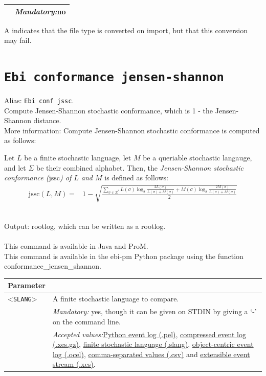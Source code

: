{\begin{tabularx}{\linewidth}{lX}
&\textit{Mandatory:}\quad no\\
\bottomrule
\end{tabularx}
A \textdagger{} indicates that the file type is converted on import, but that this conversion may fail.
\clearpage\section{\texttt{Ebi conformance jensen-shannon}}
\label{command:Ebi conformance jensen-shannon}
Alias: \texttt{Ebi conf jssc}.\\
Compute Jensen-Shannon stochastic conformance, which is 1 - the Jensen-Shannon distance.\\
More information: Compute Jensen-Shannon stochastic conformance is computed as follows:
        
        \begin{definition}
            \label{def:jssc}
                Let $L$ be a finite stochastic language, let $M$ be a queriable stochastic langauge, and let $\Sigma$ be their combined alphabet.
                Then, the \emph{Jensen-Shannon stochastic conformance ($\text{jssc}$) of $L$ and $M$} is defined as follows: 
                \begin{align*}
                    \text{jssc}(L, M) ={}& 1 - \sqrt{\frac{\sum_{\sigma \in \Sigma^*} L(\sigma) \log_2 \frac{2 L(\sigma)}{L(\sigma) + M(\sigma)} + M(\sigma) \log_2 \frac{2M(\sigma)}{L(\sigma)+ M(\sigma)}}{2}}
                \end{align*}       
            \end{definition}~\\
\noindent Output: rootlog, which can be written as a rootlog.\\
\\This command is available in Java and ProM.
\\This command is available in the ebi-pm Python package using the function conformance\_jensen\_shannon.
\begin{tabularx}{\linewidth}{lX}
\toprule
Parameter \\\midrule
<\texttt{SLANG}>&A finite stochastic language to compare.\\
&\textit{Mandatory:} \quad yes, though it can be given on STDIN by giving a `-' on the command line.\\
&\textit{Accepted values:}\quad \hyperref[filehandler:Python event log]{Python event log (.pel)}, \hyperref[filehandler:compressed event log]{compressed event log (.xes.gz)}, \hyperref[filehandler:finite stochastic language]{finite stochastic language (.slang)}, \hyperref[filehandler:object-centric event log]{object-centric event log (.ocel)}, \hyperref[filehandler:comma-separated values]{comma-separated values (.csv)} and \hyperref[filehandler:extensible event stream]{extensible event stream (.xes)}.\\

\end{tabularx}}
